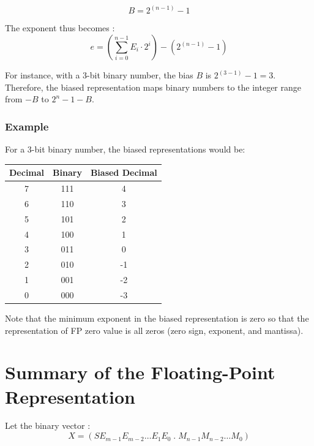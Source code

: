 \documentclass[12pt,openany, tikz,border=10pt]{book}
\begin{document}
			      	\[
			      		B = 2^{(n-1)} - 1
			      	\]
			      	
			      	
			      	The exponent thus becomes : 
			      	\[ e = (\sum_{i=0}^{n-1} E_i \cdot 2^i) - (2^{(n-1)} - 1) \]
			      	
			      	For instance, with a 3-bit binary number, the bias $B$ is $2^{(3-1)} - 1 = 3$. Therefore, the biased representation maps binary numbers to the integer range from $-B$ to $2^n - 1 - B$.
			      	
			      	\subsubsection{Example}
			      	
			      	For a 3-bit binary number, the biased representations would be:
			      	
			      	\begin{center}
			      		\begin{tabular}{ccc}
			      			\textbf{Decimal} & \textbf{Binary} & \textbf{Biased Decimal} \\
			      			\hline
			      			7                & 111             & 4                       \\
			      			6                & 110             & 3                       \\
			      			5                & 101             & 2                       \\
			      			4                & 100             & 1                       \\
			      			3                & 011             & 0                       \\
			      			2                & 010             & -1                      \\
			      			1                & 001             & -2                      \\
			      			0                & 000             & -3                      \\
			      		\end{tabular}
			      	\end{center}
			      	
			      	Note that the minimum exponent in the biased representation is zero so that the representation of FP zero value is all zeros (zero sign, exponent, and mantissa).
			      	
			      	\newpage
			      	\section*{Summary of the Floating-Point Representation}
			      	Let the binary vector : 
			      	\[ X = (S E_{m-1}E_{m-2}\dots E_1E_0 \; . \; M_{n-1}M_{n-2}\dots M_0) \]
			      	
\end{document}
